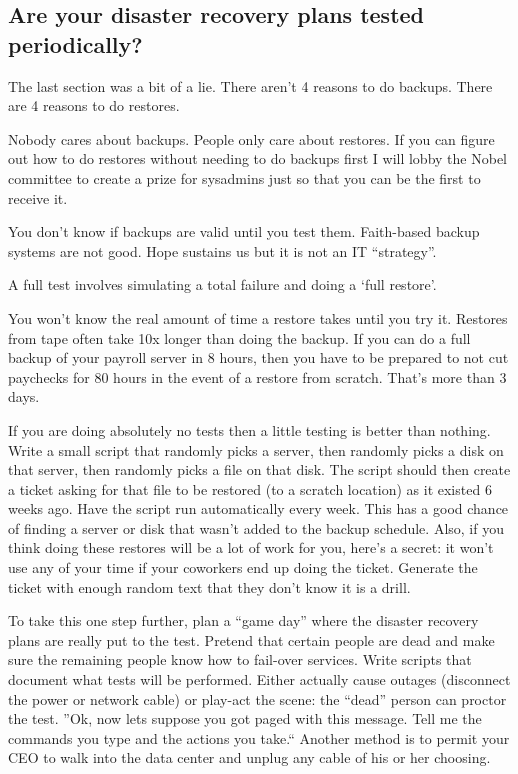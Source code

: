 \documentclass{article}
\begin{document}
\subsection{Are your disaster recovery plans tested periodically?}
The last section was a bit of a lie. There aren't 4 reasons to do backups. There are 4 reasons to do restores.

Nobody cares about backups. People only care about restores. If you can figure out how to do restores without needing to do backups first I will lobby the Nobel committee to create a prize for sysadmins just so that you can be the first to receive it.

You don't know if backups are valid until you test them. Faith-based backup systems are not good. Hope sustains us but it is not an IT ``strategy''.

A full test involves simulating a total failure and doing a `full restore'.

You won't know the real amount of time a restore takes until you try it. Restores from tape often take 10x longer than doing the backup. If you can do a full backup of your payroll server in 8 hours, then you have to be prepared to not cut paychecks for 80 hours in the event of a restore from scratch. That's more than 3 days.

If you are doing absolutely no tests then a little testing is better than nothing. Write a small script that randomly picks a server, then randomly picks a disk on that server, then randomly picks a file on that disk. The script should then create a ticket asking for that file to be restored (to a scratch location) as it existed 6 weeks ago. Have the script run automatically every week. This has a good chance of finding a server or disk that wasn't added to the backup schedule. Also, if you think doing these restores will be a lot of work for you, here's a secret: it won't use any of your time if your coworkers end up doing the ticket. Generate the ticket with enough random text that they don't know it is a drill.

To take this one step further, plan a ``game day'' where the disaster recovery plans are really put to the test. Pretend that certain people are dead and make sure the remaining people know how to fail-over services. Write scripts that document what tests will be performed. Either actually cause outages (disconnect the power or network cable) or play-act the scene: the ``dead'' person can proctor the test. ''Ok, now lets suppose you got paged with this message. Tell me the commands you type and the actions you take.`` Another method is to permit your CEO to walk into the data center and unplug any cable of his or her choosing.
\end{document}

